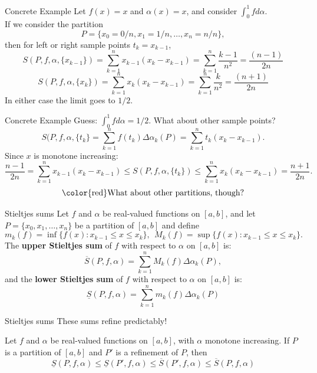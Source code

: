\documentclass{beamer}
\begin{document}
\begin{frame}{Concrete Example}
Let $f(x) = x$ and $\alpha(x) =x$, and consider $\int_0^1 f d\alpha$.\\
\pause
If we consider the partition
$$P = \{x_0=0/n,x_1=1/n,\dots,x_n=n/n\},$$
then for left or right sample points $t_k=x_{k-1}$,
$$S(P,f,\alpha,\{x_{k-1}\}) = \sum_{k=1}^n x_{k-1}(x_k-x_{k-1}) = \sum_{k=1}^n \frac{k-1}{n^2} = \frac{(n-1)}{2n}$$
$$S(P,f,\alpha,\{x_{k}\}) = \sum_{k=1}^n x_{k}(x_k-x_{k-1}) = \sum_{k=1}^n \frac{k}{n^2} = \frac{(n+1)}{2n}$$
In either case the limit goes to $1/2$.
\end{frame}

\begin{frame}{Concrete Example}
Guess: $\int_0^1 fd\alpha = 1/2$.
\pause
What about other sample points?
$$S(P,f,\alpha,\{t_k\} = \sum_{k=1}^n f(t_k)\Delta \alpha_k(P) = \sum_{k=1}^n t_k(x_k-x_{k-1}).$$
\pause
Since $x$ is monotone increasing:
{\small
$$\frac{n-1}{2n}= \sum_{k=1}^n x_{k-1}(x_k-x_{k-1})\leq S(P,f,\alpha,\{t_k\}) \leq \sum_{k=1}^n x_k(x_k-x_{k-1}) = \frac{n+1}{2n}.$$
}
$$\text{\color{red}What about other partitions, though?}$$
\end{frame}

\begin{frame}{Stieltjes sums}
Let $f$ and $\alpha$ be real-valued functions on $[a,b]$, and let $P=\{x_0,x_1,\dots,x_n\}$ be a partition of $[a,b]$ and define\\
{\small
$$m_k(f) = \inf\{f(x): x_{k-1}\leq x\leq x_k\},\ \ M_k(f) = \sup\{f(x): x_{k-1}\leq x\leq x_k\}.$$
}
\pause
The \textbf{upper Stieltjes sum} of $f$ with respect to $\alpha$ on $[a,b]$ is:
$$\overline{S}(P,f,\alpha) = \sum_{k=1}^n M_k(f)\Delta\alpha_k(P),$$
\pause
and the \textbf{lower Stieltjes sum} of $f$ with respect to $\alpha$ on $[a,b]$ is:
$$\underline{S}(P,f,\alpha) = \sum_{k=1}^n m_k(f)\Delta\alpha_k(P)$$
\end{frame}

\begin{frame}{Stieltjes sums}
These sums refine predictably!
\begin{lem}
Let $f$ and $\alpha$ be real-valued functions on $[a,b]$, with $\alpha$ monotone increasing.
\pause
If $P$ is a partition of $[a,b]$ and $P'$ is a refinement of $P$, then
$$
\underline{S}(P,f,\alpha) \leq
\underline{S}(P',f,\alpha) \leq
\overline{S}(P',f,\alpha) \leq
\overline{S}(P,f,\alpha)
$$
\end{lem}
\end{frame}
\end{document}

